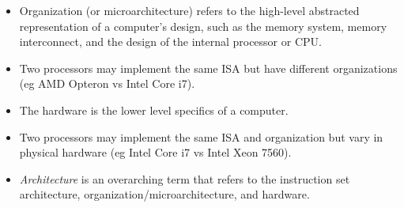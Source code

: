 \begin{itemize}
\begin{enumerate}
        \item Operations: Categories include data transfer, arithmetic logical, control, and floating point.
        \item Control flow operations: Nearly all ISAs support conditional branching, unconditional jumps, procedure calls, and returns. Address is relative to program counter (PC). 
        \item Encoding an ISA: fixed length (eg ARM and MIPS, all instructions are 32 bits long) or variable length (eg 80x86, instructions are 1-18 bytes long). Variable length binaries tend to be smaller as instructions can be packed together more.
    \end{enumerate}
    \item Organization (or microarchitecture) refers to the high-level abstracted representation of a computer's design, such as the memory system, memory interconnect, and the design of the internal processor or CPU. 
    \item Two processors may implement the same ISA but have different organizations (eg AMD Opteron vs Intel Core i7).
    \item The hardware is the lower level specifics of a computer. 
    \item Two processors may implement the same ISA and organization but vary in physical hardware (eg Intel Core i7 vs Intel Xeon 7560).
    \item \textit{Architecture} is an overarching term that refers to the instruction set architecture, organization/microarchitecture, and hardware.
\end{itemize}
